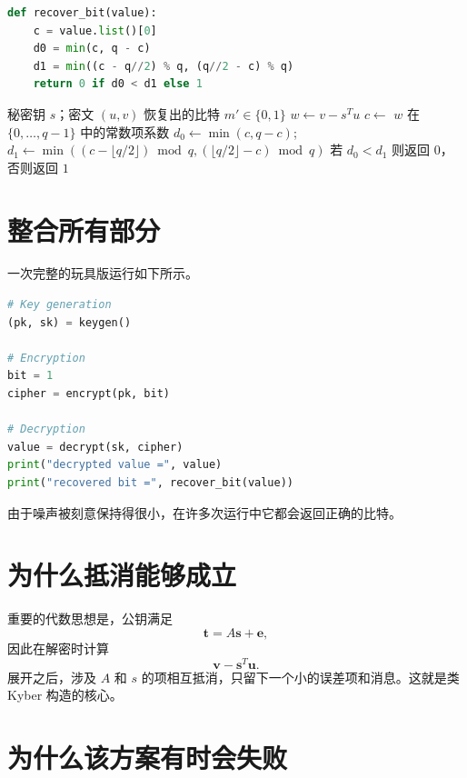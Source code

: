 \begin{lstlisting}[language=Python]
def recover_bit(value):
    c = value.list()[0]
    d0 = min(c, q - c)
    d1 = min((c - q//2) % q, (q//2 - c) % q)
    return 0 if d0 < d1 else 1
\end{lstlisting}

\begin{algorithm}[H]
\caption{玩具版解密}
\label{alg:toy-decrypt}
\begin{algorithmic}[1]
\Require 秘密钥 $s$；密文 $(u,v)$
\Ensure 恢复出的比特 $m' \in \{0,1\}$
\State $w \gets v - s^{T} u$ 
\State $c \gets$ $w$ 在 $\{0,\ldots,q-1\}$ 中的常数项系数
\State $d_0 \gets \min(c,q-c)$; \quad $d_1 \gets \min((c-\lfloor q/2\rfloor)\bmod q,(\lfloor q/2\rfloor-c)\bmod q)$
\State \Return 若 $d_0<d_1$ 则返回 $0$，否则返回 $1$
\end{algorithmic}
\end{algorithm}

\section{整合所有部分}

一次完整的玩具版运行如下所示。

\begin{lstlisting}[language=Python]
# Key generation
(pk, sk) = keygen()

# Encryption
bit = 1
cipher = encrypt(pk, bit)

# Decryption
value = decrypt(sk, cipher)
print("decrypted value =", value)
print("recovered bit =", recover_bit(value))
\end{lstlisting}

由于噪声被刻意保持得很小，在许多次运行中它都会返回正确的比特。

\section{为什么抵消能够成立}

重要的代数思想是，公钥满足
\[
\mathbf{t} = A\mathbf{s}+\mathbf{e},
\]
因此在解密时计算
\[
\mathbf{v} - \mathbf{s}^T\mathbf{u}.
\]
展开之后，涉及 $A$ 和 $s$ 的项相互抵消，只留下一个小的误差项和消息。这就是类 Kyber 构造的核心。

\section{为什么该方案有时会失败}

